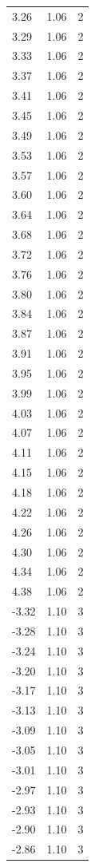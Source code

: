 \begin{longtable}{lrr}
  3.26 & 1.06 & 2 \\
  3.29 & 1.06 & 2 \\
  3.33 & 1.06 & 2 \\
  3.37 & 1.06 & 2 \\
  3.41 & 1.06 & 2 \\
  3.45 & 1.06 & 2 \\
  3.49 & 1.06 & 2 \\
  3.53 & 1.06 & 2 \\
  3.57 & 1.06 & 2 \\
  3.60 & 1.06 & 2 \\
  3.64 & 1.06 & 2 \\
  3.68 & 1.06 & 2 \\
  3.72 & 1.06 & 2 \\
  3.76 & 1.06 & 2 \\
  3.80 & 1.06 & 2 \\
  3.84 & 1.06 & 2 \\
  3.87 & 1.06 & 2 \\
  3.91 & 1.06 & 2 \\
  3.95 & 1.06 & 2 \\
  3.99 & 1.06 & 2 \\
  4.03 & 1.06 & 2 \\
  4.07 & 1.06 & 2 \\
  4.11 & 1.06 & 2 \\
  4.15 & 1.06 & 2 \\
  4.18 & 1.06 & 2 \\
  4.22 & 1.06 & 2 \\
  4.26 & 1.06 & 2 \\
  4.30 & 1.06 & 2 \\
  4.34 & 1.06 & 2 \\
  4.38 & 1.06 & 2 \\
  -3.32 & 1.10 & 3 \\
  -3.28 & 1.10 & 3 \\
  -3.24 & 1.10 & 3 \\
  -3.20 & 1.10 & 3 \\
  -3.17 & 1.10 & 3 \\
  -3.13 & 1.10 & 3 \\
  -3.09 & 1.10 & 3 \\
  -3.05 & 1.10 & 3 \\
  -3.01 & 1.10 & 3 \\
  -2.97 & 1.10 & 3 \\
  -2.93 & 1.10 & 3 \\
  -2.90 & 1.10 & 3 \\
  -2.86 & 1.10 & 3 \\

\end{longtable}
